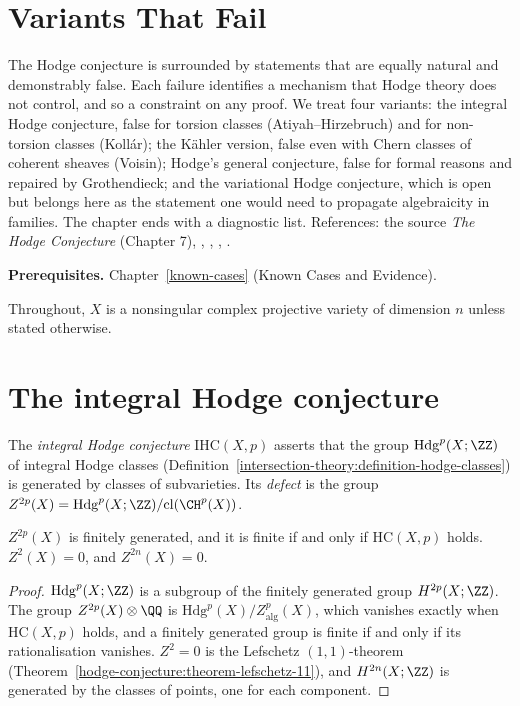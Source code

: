 \section{Variants That Fail}\label{known-cases:section-failures}
The Hodge conjecture is surrounded by statements that are equally natural and demonstrably false. Each failure identifies a mechanism that Hodge theory does not
control, and so a constraint on any proof. We treat four variants: the integral Hodge conjecture, false for torsion classes (Atiyah--Hirzebruch) and for non-torsion classes
(Koll\'ar); the K\"ahler version, false even with Chern classes of coherent sheaves (Voisin); Hodge's general conjecture, false for formal reasons and repaired by Grothendieck;
and the variational Hodge conjecture, which is open but belongs here as the statement one would need to propagate algebraicity in families. The chapter ends with a diagnostic list.
References: the source \emph{The Hodge Conjecture} (Chapter 7), \cite{atiyah-hirzebruch-1962}, \cite{kollar-1992}, \cite{voisin-2002}, \cite{grothendieck-1969}.

\noindent\textbf{Prerequisites.} Chapter~\ref{known-cases} (Known Cases and Evidence).

Throughout, $X$ is a nonsingular complex projective variety of dimension $n$ unless stated otherwise.

\section{The integral Hodge conjecture}\label{known-cases:section-integral}

\begin{definition}\label{known-cases:definition-defect}
The \emph{integral Hodge conjecture} $\mathrm{IHC}(X, p)$ asserts that the group $\mathrm{Hdg}^p(X; \ZZ)$ of integral Hodge classes (Definition~\ref{intersection-theory:definition-hodge-classes}) is generated by
classes of subvarieties. Its \emph{defect} is the group $Z^{2p}(X) = \mathrm{Hdg}^p(X; \ZZ)/\mathrm{cl}(\CH^p(X))$.
\end{definition}

\begin{proposition}\label{known-cases:proposition-defect-finite}
$Z^{2p}(X)$ is finitely generated, and it is finite if and only if $\mathrm{HC}(X, p)$ holds. $Z^2(X) = 0$, and $Z^{2n}(X) = 0$.
\end{proposition}

\begin{proof}
$\mathrm{Hdg}^p(X; \ZZ)$ is a subgroup of the finitely generated group $H^{2p}(X; \ZZ)$. The group $Z^{2p}(X) \otimes \QQ$ is $\mathrm{Hdg}^p(X)/Z^p_{\mathrm{alg}}(X)$, which vanishes exactly when
$\mathrm{HC}(X, p)$ holds, and a finitely generated group is finite if and only if its rationalisation vanishes. $Z^2 = 0$ is the Lefschetz $(1,1)$-theorem (Theorem~\ref{hodge-conjecture:theorem-lefschetz-11}),
and $H^{2n}(X; \ZZ)$ is generated by the classes of points, one for each component.
\end{proof}

